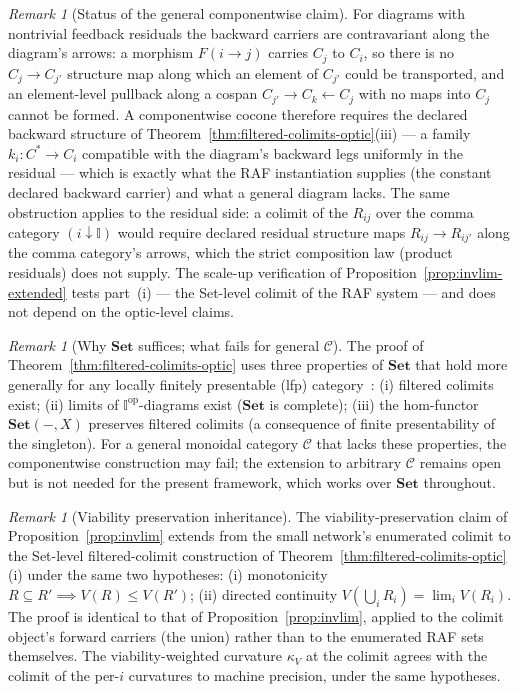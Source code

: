 \documentclass[11pt,a4paper]{article}
\theoremstyle{plain}
\theoremstyle{definition}
\theoremstyle{remark}
\newtheorem{remark}[theorem]{Remark}
\newcommand{\kk}{\kappa_{\!V}}
\newcommand{\CC}{\mathcal{C}}
\begin{document}
\begin{remark}[Status of the general componentwise claim]
\label{rem:colimit-status}
For diagrams with nontrivial feedback residuals the backward
carriers are contravariant along the diagram's arrows: a morphism
$F(i\to j)$ carries $C_{j}$ to $C_{i}$, so there is no
$C_{j}\to C_{j'}$ structure map along which an element of $C_{j'}$
could be transported, and an element-level pullback along a cospan
$C_{j'}\to C_{k}\leftarrow C_{j}$ with no maps into $C_{j}$ cannot be
formed. A componentwise cocone therefore requires the declared
backward structure of Theorem~\ref{thm:filtered-colimits-optic}(iii)
--- a family $k_{i}:C^{*}\to C_{i}$ compatible with the diagram's
backward legs uniformly in the residual --- which is exactly what the
RAF instantiation supplies (the constant declared backward carrier)
and what a general diagram lacks. The same obstruction applies to
the residual side: a colimit of the $R_{ij}$ over the comma category
$(i\downarrow\mathbb I)$ would require declared residual structure
maps $R_{ij}\to R_{ij'}$ along the comma category's arrows, which
the strict composition law (product residuals) does not supply. The
scale-up verification of Proposition~\ref{prop:invlim-extended}
tests part~(i) --- the Set-level colimit of the RAF system --- and
does not depend on the optic-level claims.
\end{remark}

\begin{remark}[Why $\mathbf{Set}$ suffices; what fails for general $\CC$]
\label{rem:set-suffices}
The proof of Theorem~\ref{thm:filtered-colimits-optic} uses three
properties of $\mathbf{Set}$ that hold more generally for any locally
finitely presentable (lfp) category~\cite{adamek1994}: (i) filtered
colimits exist; (ii) limits of $\mathbb I^{\mathrm{op}}$-diagrams
exist ($\mathbf{Set}$ is complete); (iii) the hom-functor
$\mathbf{Set}(-,X)$ preserves filtered colimits (a consequence of
finite presentability of the singleton). For a general monoidal
category $\CC$ that lacks these properties, the componentwise
construction may fail; the extension to arbitrary $\CC$ remains open
but is not needed for the present framework, which works over
$\mathbf{Set}$ throughout.
\end{remark}

\begin{remark}[Viability preservation inheritance]
\label{rem:viability-inherit}
The viability-preservation claim of Proposition~\ref{prop:invlim}
extends from the small network's enumerated colimit to the Set-level
filtered-colimit construction of
Theorem~\ref{thm:filtered-colimits-optic}(i) under the same two
hypotheses: (i) monotonicity $R\subseteq R'\implies
V(R)\leq V(R')$; (ii) directed continuity $V(\bigcup_{i}R_{i})=
\lim_{i}V(R_{i})$. The proof is identical to that of
Proposition~\ref{prop:invlim}, applied to the colimit object's
forward carriers (the union) rather than to the enumerated RAF sets
themselves. The viability-weighted curvature $\kk$ at the colimit
agrees with the colimit of the per-$i$ curvatures to machine precision,
under the same hypotheses.
\end{remark}
\end{document}
